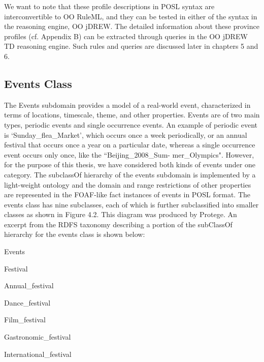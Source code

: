 \hspace{0.3in}We want to note that these profile descriptions in POSL syntax are interconvertible to OO RuleML, and they can be tested in either of the syntax in the reasoning engine, OO jDREW. The detailed information about these province profiles (cf. Appendix B) can be extracted through queries in the OO jDREW TD reasoning engine. Such rules and queries are discussed later in chapters 5 and 6.

\subsection{Events Class}

\hspace{0.3in}The Events subdomain provides a model of a real-world event, characterized in terms of locations, timescale, theme, and other properties. Events are of two main types, periodic events and single occurrence events. An example of periodic event is `Sunday\_flea\_Market', which occurs once a week periodically, or an annual festival that occurs once a year on a particular date, whereas a single occurrence event occurs only once, like the ``Beijing\_2008\_Sum- mer\_Olympics". However, for the purpose of this thesis, we have considered both kinds of events under one category. The subclassOf hierarchy of the events subdomain is implemented by a light-weight ontology and the domain and range restrictions of other properties are represented in the FOAF-like fact instances of events in POSL format. The events class has nine subclasses, each of which is further subclassified into smaller classes as shown in Figure 4.2. This diagram was produced by Protege. An excerpt from the RDFS taxonomy describing a portion of the subClassOf hierarchy for the events class is shown below:

\singlespacing
Events

\hspace{10mm}Festival

\hspace{20mm}Annual\_festival

\hspace{20mm}Dance\_festival

\hspace{20mm}Film\_festival

\hspace{20mm}Gastronomic\_festival

\hspace{20mm}International\_festival

